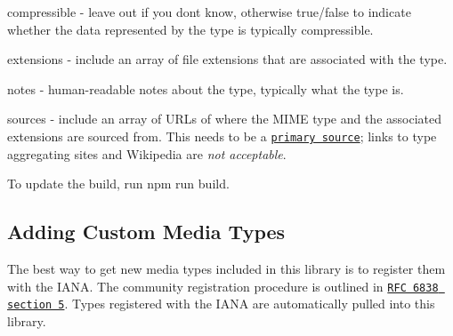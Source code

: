 \begin{DoxyItemize}
\item {\ttfamily compressible} -\/ leave out if you don\textquotesingle{}t know, otherwise {\ttfamily true}/{\ttfamily false} to indicate whether the data represented by the type is typically compressible.
\item {\ttfamily extensions} -\/ include an array of file extensions that are associated with the type.
\item {\ttfamily notes} -\/ human-\/readable notes about the type, typically what the type is.
\item {\ttfamily sources} -\/ include an array of U\+R\+Ls of where the M\+I\+ME type and the associated extensions are sourced from. This needs to be a \href{https://en.wikipedia.org/wiki/Primary_source}{\tt primary source}; links to type aggregating sites and Wikipedia are {\itshape not acceptable}.
\end{DoxyItemize}

To update the build, run {\ttfamily npm run build}.

\subsection*{Adding Custom Media Types}

The best way to get new media types included in this library is to register them with the I\+A\+NA. The community registration procedure is outlined in \href{http://tools.ietf.org/html/rfc6838#section-5}{\tt R\+FC 6838 section 5}. Types registered with the I\+A\+NA are automatically pulled into this library. 